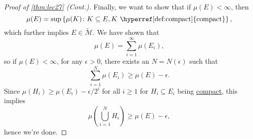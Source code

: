 \begin{proof}[Proof of \autoref{thm:lec27} (Cont.)]
	Finally, we want to show that if \(\mu (E) < \infty \), then
	\[
		\mu (E) = \sup \left\{ \mu (K)\colon K \subseteq E, K \text{ \hyperref[def:compact]{compact}}  \right\},
	\]
	which further implies \(E\in \widetilde{\mathcal{M}} \). We have shown that
	\[
		\mu (E) = \sum_{i=1}^{\infty} \mu (E_i),
	\]
	so if \(\mu (E) < \infty \), for any \(\epsilon > 0\), there exists an \(N = N(\epsilon )\) such that
	\[
		\sum_{i=1}^{N} \mu (E_i) \geq \mu (E) - \epsilon .
	\]
	Since \(\mu (H_i) \geq \mu (E_i) - \epsilon / 2^i\) for all \(i \geq 1\) for \(H_i \subseteq E_i\) being \hyperref[def:compact]{compact}, this implies
	\[
		\mu \left( \bigcup_{i=1}^{N} H_i \right) \geq \mu (E) - \epsilon,
	\]
	hence we're done.
\end{proof}
